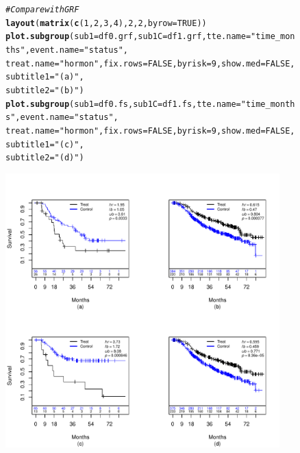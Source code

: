 \documentclass[9pt]{article}\usepackage[]{graphicx}\usepackage[]{xcolor}
\makeatletter
\newcommand{\hlnum}[1]{\textcolor[rgb]{0.686,0.059,0.569}{#1}}%
\newcommand{\hlstr}[1]{\textcolor[rgb]{0.192,0.494,0.8}{#1}}%
\newcommand{\hlcom}[1]{\textcolor[rgb]{0.678,0.584,0.686}{\textit{#1}}}%
\newcommand{\hlstd}[1]{\textcolor[rgb]{0.345,0.345,0.345}{#1}}%
\newcommand{\hlkwc}[1]{\textcolor[rgb]{0.333,0.667,0.333}{#1}}%
\newcommand{\hlkwd}[1]{\textcolor[rgb]{0.737,0.353,0.396}{\textbf{#1}}}%
\newenvironment{kframe}{%
 \def\at@end@of@kframe{}%
 \ifinner\ifhmode%
  \def\at@end@of@kframe{\end{minipage}}%
  \begin{minipage}{\columnwidth}%
 \fi\fi%
 \def\FrameCommand##1{\hskip\@totalleftmargin \hskip-\fboxsep
 \colorbox{shadecolor}{##1}\hskip-\fboxsep
     \hskip-\linewidth \hskip-\@totalleftmargin \hskip\columnwidth}%
 \MakeFramed {\advance\hsize-\width
   \@totalleftmargin\z@ \linewidth\hsize
   \@setminipage}}%
 {\par\unskip\endMakeFramed%
 \at@end@of@kframe}
\newenvironment{knitrout}{}{} %
\theoremstyle{definition}
\theoremstyle{remark}
\makeatother
\begin{document}
\begin{figure}[h!]
\begin{center}
\begin{knitrout}
\color{fgcolor}\begin{kframe}
\begin{alltt}
\hlcom{# Compare with GRF}
\hlkwd{layout}\hlstd{(}\hlkwd{matrix}\hlstd{(}\hlkwd{c}\hlstd{(}\hlnum{1}\hlstd{,} \hlnum{2}\hlstd{,} \hlnum{3}\hlstd{,} \hlnum{4}\hlstd{),} \hlnum{2}\hlstd{,} \hlnum{2}\hlstd{,} \hlkwc{byrow} \hlstd{=} \hlnum{TRUE}\hlstd{))}
\hlkwd{plot.subgroup}\hlstd{(}\hlkwc{sub1} \hlstd{= df0.grf,} \hlkwc{sub1C} \hlstd{= df1.grf,} \hlkwc{tte.name} \hlstd{=} \hlstr{"time_months"}\hlstd{,} \hlkwc{event.name} \hlstd{=} \hlstr{"status"}\hlstd{,}
    \hlkwc{treat.name} \hlstd{=} \hlstr{"hormon"}\hlstd{,} \hlkwc{fix.rows} \hlstd{=} \hlnum{FALSE}\hlstd{,} \hlkwc{byrisk} \hlstd{=} \hlnum{9}\hlstd{,} \hlkwc{show.med} \hlstd{=} \hlnum{FALSE}\hlstd{,} \hlkwc{subtitle1} \hlstd{=} \hlstr{"(a)"}\hlstd{,}
    \hlkwc{subtitle2} \hlstd{=} \hlstr{"(b)"}\hlstd{)}
\hlkwd{plot.subgroup}\hlstd{(}\hlkwc{sub1} \hlstd{= df0.fs,} \hlkwc{sub1C} \hlstd{= df1.fs,} \hlkwc{tte.name} \hlstd{=} \hlstr{"time_months"}\hlstd{,} \hlkwc{event.name} \hlstd{=} \hlstr{"status"}\hlstd{,}
    \hlkwc{treat.name} \hlstd{=} \hlstr{"hormon"}\hlstd{,} \hlkwc{fix.rows} \hlstd{=} \hlnum{FALSE}\hlstd{,} \hlkwc{byrisk} \hlstd{=} \hlnum{9}\hlstd{,} \hlkwc{show.med} \hlstd{=} \hlnum{FALSE}\hlstd{,} \hlkwc{subtitle1} \hlstd{=} \hlstr{"(c)"}\hlstd{,}
    \hlkwc{subtitle2} \hlstd{=} \hlstr{"(d)"}\hlstd{)}
\end{alltt}
\end{kframe}
\includegraphics[width=400px,height=400px]{figure/GBSG_grf-fs_sg-1} 
\end{knitrout}
\end{center}
\end{figure}
\end{document}
